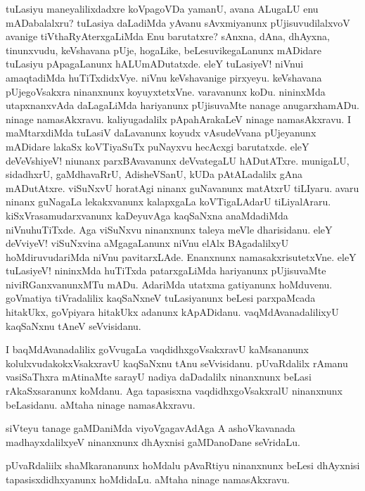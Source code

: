 \documentclass{article}
\begin{document}
\begin{mng}%
tuLasiyu maneyalilixdadxre koVpagoVDa yamanU, avana ALugaLU enu 
mADabalalxru? tuLasiya daLadiMda yAvanu sAvxmiyanunx pUjisuvudilalxvoV 
avanige tiVthaRyAterxgaLiMda Enu barutatxre? sAnxna, dAna, dhAyxna, 
tinunxvudu, keVshavana pUje, hogaLike, beLesuvikegaLanunx mADidare 
tuLasiyu pApagaLanunx hALUmADutatxde. eleY tuLasiyeV! niVnui 
amaqtadiMda huTiTxdidxVye. niVnu keVshavanige pirxyeyu. keVshavana 
pUjegoVsakxra ninanxnunx koyuyxtetxVne. varavanunx koDu. nininxMda 
utapxnanxvAda daLagaLiMda hariyanunx pUjisuvaMte nanage anugarxhamADu. 
ninage namasAkxravu. kaliyugadalilx pApahArakaLeV ninage namasAkxravu. 
I maMtarxdiMda tuLasiV daLavanunx koyudx vAsudeVvana pUjeyanunx 
mADidare lakaSx koVTiyaSuTx puNayxvu hecAcxgi barutatxde. eleY 
deVeVshiyeV! niunanx parxBAvavanunx deVvategaLU hADutATxre. munigaLU, 
sidadhxrU, gaMdhavaRrU, AdisheVSanU, kUDa pAtALadalilx gAna 
mADutAtxre. viSuNxvU horatAgi ninanx guNavanunx matAtxrU tiLIyaru. 
avaru ninanx guNagaLa lekakxvanunx kalapxgaLa koVTigaLAdarU 
tiLiyalAraru. kiSxVrasamudarxvanunx kaDeyuvAga kaqSaNxna anaMdadiMda 
niVnuhuTiTxde. Aga viSuNxvu ninanxnunx taleya meVle dharisidanu. eleY deVviyeV! 
viSuNxvina aMgagaLanunx niVnu elAlx BAgadalilxyU hoMdiruvudariMda niVnu pavitarxLAde. 
Enanxnunx namasakxrisutetxVne. eleY tuLasiyeV! nininxMda huTiTxda patarxgaLiMda
hariyanunx pUjisuvaMte niviRGanxvanunxMTu mADu. AdariMda utatxma gatiyanunx hoMduvenu. goVmatiya tiVradalilix kaqSaNxneV 
tuLasiyanunx beLesi parxpaMcada hitakUkx, goVpiyara hitakUkx adanunx
kApADidanu. vaqMdAvanadalilixyU kaqSaNxnu tAneV seVvisidanu. 
\end{mng}

\begin{mng}%
I baqMdAvanadalilix goVvugaLa vaqdidhxgoVsakxravU kaMsananunx kolulxvudakokxVsakxravU kaqSaNxnu tAnu seVvisidanu. pUvaRdalilx
rAmanu vasiSaThxra mAtinaMte sarayU nadiya daDadalilx ninanxnunx beLasi rAkaSxsaranunx koMdanu. Aga tapasisxna vaqdidhxgoVsakxralU ninanxnunx beLasidanu. aMtaha ninage namasAkxravu. 
\end{mng}

\begin{mng}%
siVteyu tanage gaMDaniMda viyoVgagavAdAga A ashoVkavanada madhayxdalilxyeV ninanxnunx dhAyxnisi gaMDanoDane seVridaLu.
\end{mng}

\begin{mng}%
pUvaRdaliilx shaMkarananunx hoMdalu pAvaRtiyu ninanxnunx beLesi dhAyxnisi tapasisxdidhxyanunx hoMdidaLu. aMtaha ninage namasAkxravu.
\end{mng}
\end{document}
